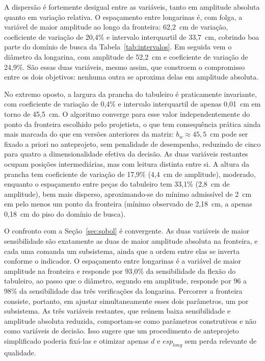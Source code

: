 A dispersão é fortemente desigual entre as variáveis, tanto em amplitude absoluta quanto em variação relativa.
O espaçamento entre longarinas é, com folga, a variável de maior amplitude ao longo da fronteira: 62{,}2~cm de variação, coeficiente de variação de 20{,}4\% e intervalo interquartil de 33{,}7~cm, cobrindo boa parte do domínio de busca da Tabela~\ref{tab:intervalos}.
Em seguida vem o diâmetro da longarina, com amplitude de 52{,}2~cm e coeficiente de variação de 24{,}9\%.
São essas duas variáveis, mesmo assim, que constroem o compromisso entre os dois objetivos: nenhuma outra se aproxima delas em amplitude absoluta.

No extremo oposto, a largura da prancha do tabuleiro é praticamente invariante, com coeficiente de variação de 0{,}4\% e intervalo interquartil de apenas 0{,}01~cm em torno de 45{,}5~cm.
O algoritmo converge para esse valor independentemente do ponto da fronteira escolhido pelo projetista, o que tem consequência prática ainda mais marcada do que em versões anteriores da matriz: $b_w \approx 45{,}5$~cm pode ser fixado a priori no anteprojeto, sem penalidade de desempenho, reduzindo de cinco para quatro a dimensionalidade efetiva da decisão.
As duas variáveis restantes ocupam posições intermediárias, mas com leitura distinta entre si. A altura da prancha tem coeficiente de variação de 17{,}9\% (4{,}4~cm de amplitude), moderado, enquanto o espaçamento entre peças do tabuleiro tem 33{,}1\% (2{,}8~cm de amplitude), bem mais disperso, aproximando-se do mínimo admissível de 2~cm em pelo menos um ponto da fronteira (mínimo observado de 2{,}18~cm, a apenas 0{,}18~cm do piso do domínio de busca).

O confronto com a Seção~\ref{sec:sobol} é convergente.
As duas variáveis de maior sensibilidade são exatamente as duas de maior amplitude absoluta na fronteira, e cada uma comanda um subsistema, ainda que a ordem entre elas se inverta conforme o indicador. O espaçamento entre longarinas é a variável de maior amplitude na fronteira e responde por 93{,}0\% da sensibilidade da flexão do tabuleiro, ao passo que o diâmetro, segundo em amplitude, responde por 96 a 98\% da sensibilidade das três verificações da longarina.
Percorrer a fronteira consiste, portanto, em ajustar simultaneamente esses dois parâmetros, um por subsistema.
As três variáveis restantes, que reúnem baixa sensibilidade e amplitude absoluta reduzida, comportam-se como parâmetros construtivos e não como variáveis de decisão. Isso sugere que um procedimento de anteprojeto simplificado poderia fixá-las e otimizar apenas $d$ e $esp_{long}$ sem perda relevante de qualidade.

